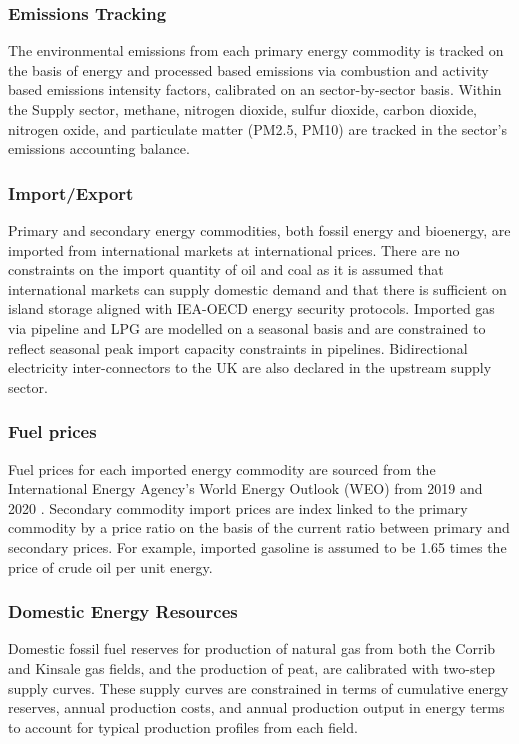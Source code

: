 \documentclass[gmd,manuscript]{copernicus}
\begin{document}
\subsubsection{Emissions Tracking}
The environmental emissions from each primary energy commodity is tracked on the basis of energy and processed based emissions via combustion and activity based emissions intensity factors, calibrated on an sector-by-sector basis. Within the Supply sector, methane, nitrogen dioxide, sulfur dioxide, carbon dioxide, nitrogen oxide, and particulate matter (PM2.5, PM10) are tracked in the sector's emissions accounting balance.

\subsubsection{Import/Export}
Primary and secondary energy commodities, both fossil energy and bioenergy, are imported from international markets at international prices. There are no constraints on the import quantity of oil and coal as it is assumed that international markets can supply domestic demand and that there is sufficient on island storage aligned with IEA-OECD energy security protocols. Imported gas via pipeline and LPG are modelled on a seasonal basis and are constrained to reflect seasonal peak import capacity constraints in pipelines. Bidirectional electricity inter-connectors to the UK are also declared in the upstream supply sector.

\subsubsection{Fuel prices}
Fuel prices for each imported energy commodity are sourced from the International Energy Agency's World Energy Outlook (WEO) from 2019 and 2020 \citep{InternationalEnergyAgency2020}. Secondary commodity import prices are index linked to the primary commodity by a price ratio on the basis of the current ratio between primary and secondary prices. For example, imported gasoline is assumed to be 1.65 times the price of crude oil per unit energy.


\subsubsection{Domestic Energy Resources}
Domestic fossil fuel reserves for production of natural gas from both the Corrib and Kinsale gas fields, and the production of peat, are calibrated with two-step supply curves. These supply curves are constrained in terms of cumulative energy reserves, annual production costs, and annual production output in energy terms to account for typical production profiles from each field.
\end{document}
